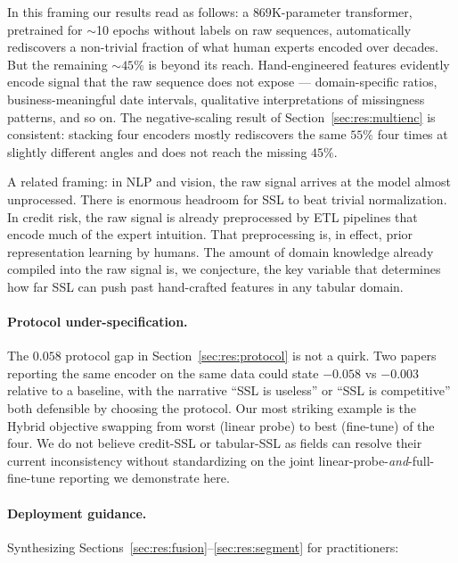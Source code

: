 \documentclass[sigconf, anonymous, review]{acmart}
\begin{document}
In this framing our results read as follows: a $869$K-parameter
transformer, pretrained for $\sim$10 epochs without labels on raw
sequences, automatically rediscovers a non-trivial fraction of what
human experts encoded over decades. But the remaining $\sim 45\%$ is
beyond its reach. Hand-engineered features evidently encode signal
that the raw sequence does not expose --- domain-specific ratios,
business-meaningful date intervals, qualitative interpretations of
missingness patterns, and so on. The negative-scaling result of
Section~\ref{sec:res:multienc} is consistent: stacking four encoders
mostly rediscovers the same $55\%$ four times at slightly different
angles and does not reach the missing $45\%$.

A related framing: in NLP and vision, the raw signal arrives at the
model almost unprocessed. There is enormous headroom for SSL to
beat trivial normalization. In credit risk, the raw signal is
already preprocessed by ETL pipelines that encode much of the
expert intuition. That preprocessing is, in effect, prior
representation learning by humans. The amount of domain knowledge
already compiled into the raw signal is, we conjecture, the key
variable that determines how far SSL can push past hand-crafted
features in any tabular domain.

\paragraph{Protocol under-specification.}
The $0.058$ protocol gap in Section~\ref{sec:res:protocol} is not a
quirk. Two papers reporting the same encoder on the same data could
state $-0.058$ vs $-0.003$ relative to a baseline, with the
narrative ``SSL is useless'' or ``SSL is competitive'' both
defensible by choosing the protocol. Our most striking example is
the Hybrid objective swapping from worst (linear probe) to best
(fine-tune) of the four. We do not believe credit-SSL or tabular-SSL
as fields can resolve their current inconsistency without standardizing
on the joint linear-probe-\emph{and}-full-fine-tune reporting we
demonstrate here.

\paragraph{Deployment guidance.}
Synthesizing Sections~\ref{sec:res:fusion}--\ref{sec:res:segment} for
practitioners:
\end{document}
